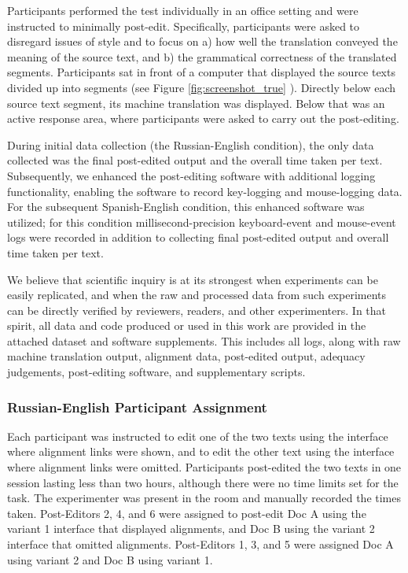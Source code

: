 Participants performed the test individually in an office setting and were instructed to minimally post-edit. 
%
Specifically, participants were asked to disregard issues of style and to focus on 
%
a) how well the translation conveyed the meaning of the source text, and 
%
b) the grammatical correctness of the translated segments. 
%
Participants sat in front of a computer that displayed the source texts divided up into segments (see Figure \ref{fig:screenshot_true} ). %
%
Directly below each source text segment, its machine translation was displayed.
%
Below that was an active response area, where participants were asked to carry out the post-editing.

During initial data collection (the Russian-English condition), the only data collected was the final post-edited output and the overall time taken per text.
%
Subsequently, we enhanced the post-editing software with additional logging functionality, enabling the software to record key-logging and mouse-logging data.
%
For the subsequent Spanish-English condition, this enhanced software was utilized; for this condition millisecond-precision keyboard-event and mouse-event logs were recorded in addition to collecting final post-edited output and overall time taken per text.

We believe that scientific inquiry is at its strongest when experiments can be easily replicated, and when the raw and processed data from such experiments can be directly verified by reviewers, readers, and other experimenters.
%
In that spirit, all data and code produced or used in this work are provided in the attached dataset and software supplements.
%
This includes all logs, along with raw machine translation output, alignment data, post-edited output, adequacy judgements, post-editing software, and supplementary scripts.



\subsubsection{Russian-English Participant Assignment}




Each participant was instructed to edit one of the two texts using the interface where alignment links were shown,
%
and to edit the other text using the interface where alignment links were omitted.
%
Participants post-edited the two texts in one session lasting less than two hours, although there were no time limits set for the task.
%
The experimenter was present in the room and manually recorded the times taken.
%
Post-Editors 2, 4, and 6 were assigned to post-edit Doc A using the variant 1 interface that displayed alignments, and Doc B using the variant 2 interface that omitted alignments.
%
Post-Editors 1, 3, and 5 were assigned Doc A using variant 2 and Doc B using variant 1.

